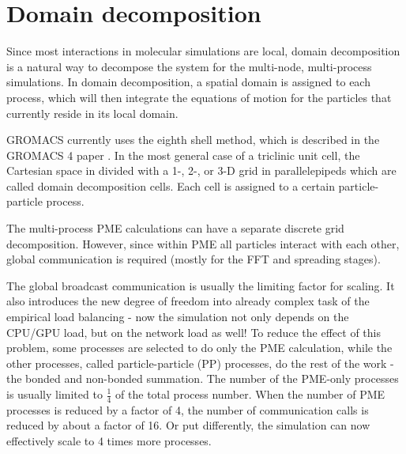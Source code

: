 \documentclass[12pt,a4paper]{report}
\begin{document}
\section{Domain decomposition} \label{chapter:DD}
Since most interactions in molecular simulations are local, domain decomposition is a natural way to decompose the system for the multi-node, multi-process simulations. In domain decomposition, a spatial domain is assigned to each process,
which will then integrate the equations of motion for the particles that currently reside in its local
domain.

GROMACS currently uses the eighth shell method, which is described in the GROMACS 4 paper \cite{gromacs4dd}. In the most general case of a triclinic unit cell, the Cartesian space in divided with a 1-, 2-, or 3-D grid in
parallelepipeds which are called domain decomposition cells. Each cell is assigned to a certain particle-particle 
process. 

The multi-process PME calculations can have a separate discrete grid decomposition.
However, since within PME all particles interact with each other, global communication is required (mostly for the FFT and spreading stages). 

The global broadcast communication is usually the limiting factor for scaling. It also introduces the new degree of freedom into already complex task of the empirical load balancing - now the simulation not only depends on the CPU/GPU load, but on the network load as well! 
 To reduce the effect of this problem, some processes are selected to do only the PME calculation, while the other processes, called particle-particle (PP) processes, do the rest of the work - the bonded and non-bonded summation. The number of the PME-only processes is usually limited to $\frac{1}{4}$ of the total process number. When the number of PME processes is reduced by a factor of
4, the number of communication calls is reduced by about a factor of 16. Or put differently, the simulation can now effectively scale to 4 times more processes.
 

\end{document}
